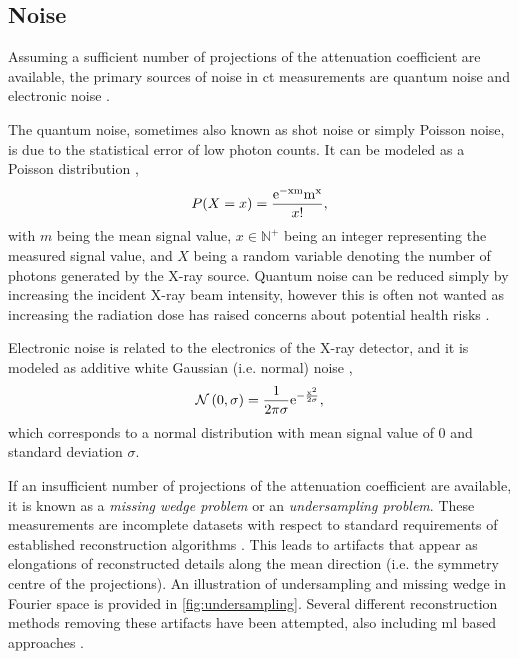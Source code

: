 \subsection{Noise}
\label{sec:ct:theory:noise}
Assuming a sufficient number of projections of the attenuation coefficient are available, the primary sources of noise in \gls{ct} measurements are quantum noise and electronic noise \cite{boas2012ct}. 

The quantum noise, sometimes also known as shot noise or simply Poisson noise, is due to the statistical error of low photon counts. It can be modeled as a Poisson distribution \cite{Whiting2006},
\begin{equation}
    \label{eq:poissonnoise}
    P(X = x) = \frac{\rm{e}^{-xm}m^x}{x!},
\end{equation}
with $m$ being the mean signal value, $x \in \mathbb{N}^+$ being an integer representing the measured signal value, and $X$ being a random variable denoting the number of photons generated by the X-ray source. Quantum noise can be reduced simply by increasing the incident X-ray beam intensity, however this is often not wanted as increasing the radiation dose has raised concerns about potential health risks \cite{doi:10.1056/NEJMra072149,PEARCE2012499}. 

Electronic noise is related to the electronics of the X-ray detector, and it is modeled as additive white Gaussian (i.e. normal) noise \cite{boas2012ct},
\begin{equation}
    \mathcal{N}\left(0,\sigma \right) = \frac{1}{2\pi\sigma}\rm{e}^{-\frac{x^2}{2\sigma}},
\end{equation}
which corresponds to a normal distribution with mean signal value of $0$ and standard deviation $\sigma$.

If an insufficient number of projections of the attenuation coefficient are available, it is known as a \textit{missing wedge problem} or an \textit{undersampling problem}. These measurements are incomplete datasets with respect to standard requirements of established reconstruction algorithms \cite{10.1111/jmi.12313}. This leads to artifacts that appear as elongations of reconstructed details along the mean direction (i.e. the symmetry centre of the projections). An illustration of undersampling and missing wedge in Fourier space is provided in \cref{fig:undersampling}. Several different reconstruction methods removing these artifacts have been attempted, also including \gls{ml} based approaches \cite{liu2020tomogan,GANrec}. 

